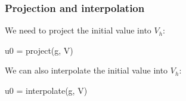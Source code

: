 \begin{frame}[fragile]
  \frametitle{Projection and interpolation}

  We need to project the initial value into $V_h$:
  \vspace{-1em}
  \begin{python}
u0 = project(g, V)
  \end{python}

  \bigskip

  We can also interpolate the initial value into $V_h$:
  \vspace{-1em}
  \begin{python}
u0 = interpolate(g, V)
  \end{python}

\end{frame}
